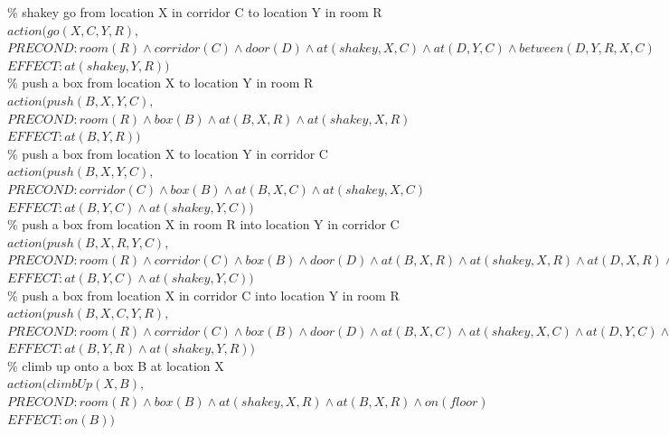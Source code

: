 \documentclass{article}%
\begin{document}
\begin{enumerate}
	\% shakey go from location X in corridor C to location Y in room R\\
	$action( go(X,C,Y,R), $ \\
	$PRECOND: room(R) \wedge corridor(C) \wedge door(D) \wedge at(shakey,X,C) \wedge at(D,Y,C) \wedge between(D,Y,R,X,C) $ \\
	$EFFECT: at(shakey,Y,R)) $\\
	
	\% push a box from location X to location Y in room R\\
	$action( push(B,X,Y,C), $ \\
	$PRECOND: room(R) \wedge box(B) \wedge at(B,X,R) \wedge at(shakey,X,R)$\\
	$EFFECT: at(B,Y,R)) $\\
	
    \% push a box from location X to location Y in corridor C\\
	$action( push(B,X,Y,C), $ \\
	$PRECOND: corridor(C) \wedge box(B) \wedge at(B,X,C) \wedge at(shakey,X,C)$\\
	$EFFECT: at(B,Y,C) \wedge at(shakey,Y,C)) $\\
	
	\% push a box from location X in room R into location Y in corridor C \\
	$action( push(B,X,R,Y,C), $ \\
	$PRECOND: room(R) \wedge corridor(C) \wedge box(B) \wedge door(D) \wedge at(B,X,R) \wedge at(shakey,X,R)  \wedge at(D,X,R) \wedge between(D,X,R,Y,C)$ \\
	$EFFECT: at(B,Y,C) \wedge at(shakey,Y,C)) $\\
	
	\% push a box from location X in corridor C into location Y in room R\\
	$action( push(B,X,C,Y,R), $ \\
	$PRECOND: room(R) \wedge corridor(C) \wedge box(B) \wedge door(D) \wedge at(B,X,C) \wedge at(shakey,X,C) \wedge at(D,Y,C) \wedge between(D,Y,R,X,C)$ \\
	$EFFECT: at(B,Y,R) \wedge at(shakey,Y,R)) $\\
	
	
	\% climb up onto a box B at location X\\
	$action( climbUp(X,B), $ \\
	$PRECOND: room(R) \wedge box(B) \wedge at(shakey,X,R) \wedge at(B,X,R) \wedge on(floor) $\\
	$EFFECT: on(B)) $\\
	

\end{enumerate}
\end{document}
